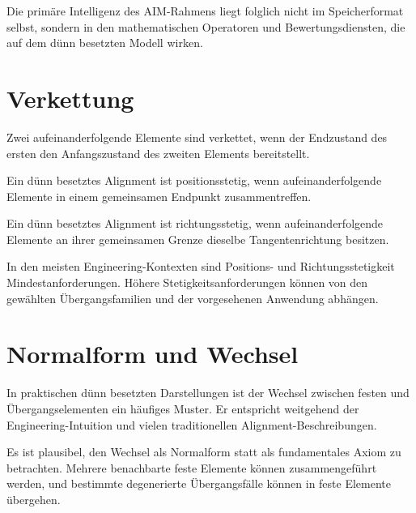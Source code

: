 Die primäre Intelligenz des AIM-Rahmens liegt folglich nicht im Speicherformat
selbst, sondern in den mathematischen Operatoren und Bewertungsdiensten, die
auf dem dünn besetzten Modell wirken.

\section{Verkettung}

\begin{definition}[Elementverkettung]
Zwei aufeinanderfolgende Elemente sind verkettet, wenn der Endzustand des
ersten den Anfangszustand des zweiten Elements bereitstellt.
\end{definition}

\begin{definition}[Positionsstetigkeit]
Ein dünn besetztes Alignment ist positionsstetig, wenn aufeinanderfolgende
Elemente in einem gemeinsamen Endpunkt zusammentreffen.
\end{definition}

\begin{definition}[Richtungsstetigkeit]
Ein dünn besetztes Alignment ist richtungsstetig, wenn aufeinanderfolgende
Elemente an ihrer gemeinsamen Grenze dieselbe Tangentenrichtung besitzen.
\end{definition}

In den meisten Engineering-Kontexten sind Positions- und Richtungsstetigkeit
Mindestanforderungen. Höhere Stetigkeitsanforderungen können von den gewählten
Übergangsfamilien und der vorgesehenen Anwendung abhängen.


\section{Normalform und Wechsel}

In praktischen dünn besetzten Darstellungen ist der Wechsel zwischen festen
und Übergangselementen ein häufiges Muster. Er entspricht weitgehend der
Engineering-Intuition und vielen traditionellen Alignment-Beschreibungen.


Es ist plausibel, den Wechsel als Normalform statt als fundamentales Axiom zu
betrachten. Mehrere benachbarte feste Elemente können zusammengeführt werden,
und bestimmte degenerierte Übergangsfälle können in feste Elemente übergehen.

